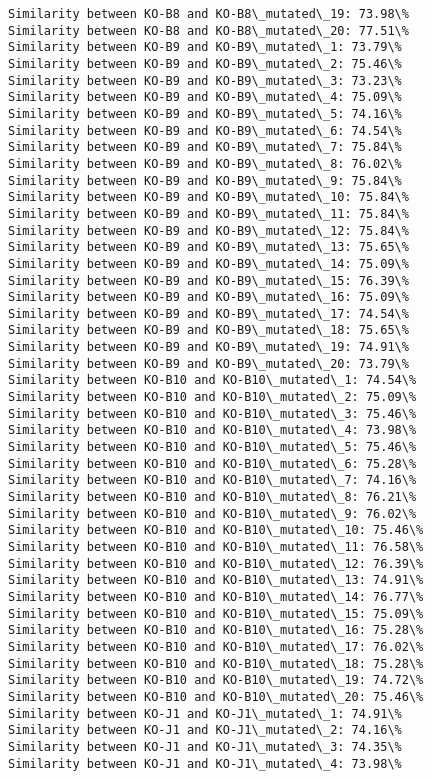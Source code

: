 \documentclass[11pt]{article}
\begin{document}
\begin{Verbatim}[commandchars=\\\{\}]
Similarity between KO-B8 and KO-B8\_mutated\_19: 73.98\%
Similarity between KO-B8 and KO-B8\_mutated\_20: 77.51\%
Similarity between KO-B9 and KO-B9\_mutated\_1: 73.79\%
Similarity between KO-B9 and KO-B9\_mutated\_2: 75.46\%
Similarity between KO-B9 and KO-B9\_mutated\_3: 73.23\%
Similarity between KO-B9 and KO-B9\_mutated\_4: 75.09\%
Similarity between KO-B9 and KO-B9\_mutated\_5: 74.16\%
Similarity between KO-B9 and KO-B9\_mutated\_6: 74.54\%
Similarity between KO-B9 and KO-B9\_mutated\_7: 75.84\%
Similarity between KO-B9 and KO-B9\_mutated\_8: 76.02\%
Similarity between KO-B9 and KO-B9\_mutated\_9: 75.84\%
Similarity between KO-B9 and KO-B9\_mutated\_10: 75.84\%
Similarity between KO-B9 and KO-B9\_mutated\_11: 75.84\%
Similarity between KO-B9 and KO-B9\_mutated\_12: 75.84\%
Similarity between KO-B9 and KO-B9\_mutated\_13: 75.65\%
Similarity between KO-B9 and KO-B9\_mutated\_14: 75.09\%
Similarity between KO-B9 and KO-B9\_mutated\_15: 76.39\%
Similarity between KO-B9 and KO-B9\_mutated\_16: 75.09\%
Similarity between KO-B9 and KO-B9\_mutated\_17: 74.54\%
Similarity between KO-B9 and KO-B9\_mutated\_18: 75.65\%
Similarity between KO-B9 and KO-B9\_mutated\_19: 74.91\%
Similarity between KO-B9 and KO-B9\_mutated\_20: 73.79\%
Similarity between KO-B10 and KO-B10\_mutated\_1: 74.54\%
Similarity between KO-B10 and KO-B10\_mutated\_2: 75.09\%
Similarity between KO-B10 and KO-B10\_mutated\_3: 75.46\%
Similarity between KO-B10 and KO-B10\_mutated\_4: 73.98\%
Similarity between KO-B10 and KO-B10\_mutated\_5: 75.46\%
Similarity between KO-B10 and KO-B10\_mutated\_6: 75.28\%
Similarity between KO-B10 and KO-B10\_mutated\_7: 74.16\%
Similarity between KO-B10 and KO-B10\_mutated\_8: 76.21\%
Similarity between KO-B10 and KO-B10\_mutated\_9: 76.02\%
Similarity between KO-B10 and KO-B10\_mutated\_10: 75.46\%
Similarity between KO-B10 and KO-B10\_mutated\_11: 76.58\%
Similarity between KO-B10 and KO-B10\_mutated\_12: 76.39\%
Similarity between KO-B10 and KO-B10\_mutated\_13: 74.91\%
Similarity between KO-B10 and KO-B10\_mutated\_14: 76.77\%
Similarity between KO-B10 and KO-B10\_mutated\_15: 75.09\%
Similarity between KO-B10 and KO-B10\_mutated\_16: 75.28\%
Similarity between KO-B10 and KO-B10\_mutated\_17: 76.02\%
Similarity between KO-B10 and KO-B10\_mutated\_18: 75.28\%
Similarity between KO-B10 and KO-B10\_mutated\_19: 74.72\%
Similarity between KO-B10 and KO-B10\_mutated\_20: 75.46\%
Similarity between KO-J1 and KO-J1\_mutated\_1: 74.91\%
Similarity between KO-J1 and KO-J1\_mutated\_2: 74.16\%
Similarity between KO-J1 and KO-J1\_mutated\_3: 74.35\%
Similarity between KO-J1 and KO-J1\_mutated\_4: 73.98\%

\end{Verbatim}
\end{document}
